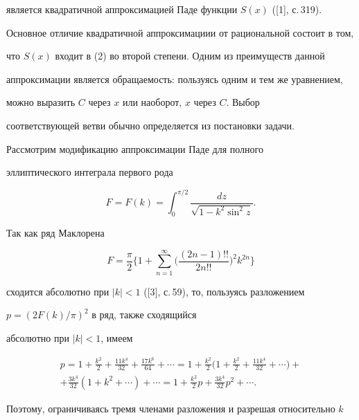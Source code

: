 является квадратичной аппроксимацией Паде функции $S(x)$ ([1], с.\,319). 


Основное отличие квадратичной аппроксимациии от рациональной состоит в том, 


что $S(x)$ входит в (2) во второй степени. Одним из преимуществ данной 


аппроксимации является обращаемость: пользуясь одним и тем же уравнением, 


можно выразить $C$ через $x$ или наоборот, $x$ через $C$. Выбор 


соответствующей ветви обычно определяется из постановки задачи. 





Рассмотрим модификацию аппроксимации Паде для полного 


эллиптического интеграла первого рода 


\begin{equation}


F=F(k)=\int_0^{\pi/2} 


\frac{dz}{\sqrt{1-k^2\sin^2 z}}.


\end{equation}


Так как ряд Маклорена  


$$


F=\frac{\pi}{2}\bigg\{1+\sum_{n=1}^\infty 


\bigg(\frac{(2n-1)!!}{2n!!}\bigg)^2k^{2n}\bigg\}


$$


сходится абсолютно при $|k|<1$ ([3], с.\,59), то, пользуясь разложением 


$p=(2F(k)/\pi)^2$ в ряд, также сходящийся 


абсолютно при $|k|<1$, имеем  


\begin{multline*}


p=1+\frac{k^2}{2}+\frac{11k^4}{32}+\frac{17k^6}{64}+\dotsb


=1+\frac{k^2}{2}\bigg(1+\frac{k^2}{2}+\frac{11k^4}{32}+\dotsb\bigg)+ \\


%


+\frac{3k^4}{32}(1+k^2+\dotsb)+\dotsb=


1+\frac{k^2}{2}p+\frac{3k^4}{32}p^2+\dotsb.


\end{multline*} 


Поэтому, ограничиваясь тремя членами разложения и разрешая относительно $k$ 


